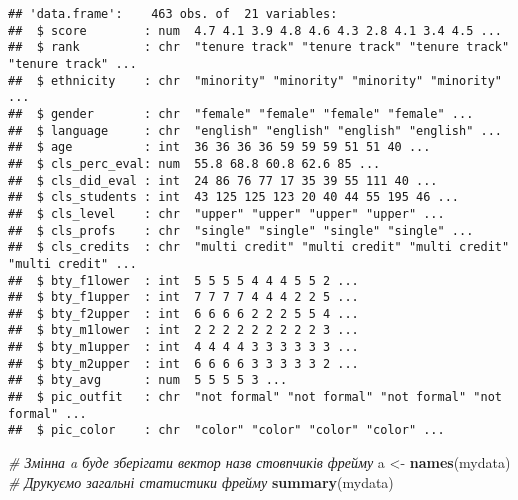 \documentclass[
]{article}
\newenvironment{Shaded}{\begin{snugshade}}{\end{snugshade}}
\newcommand{\CommentTok}[1]{\textcolor[rgb]{0.56,0.35,0.01}{\textit{#1}}}
\newcommand{\KeywordTok}[1]{\textcolor[rgb]{0.13,0.29,0.53}{\textbf{#1}}}
\newcommand{\NormalTok}[1]{#1}
\newcommand{\StringTok}[1]{\textcolor[rgb]{0.31,0.60,0.02}{#1}}
\begin{document}
\begin{verbatim}
## 'data.frame':    463 obs. of  21 variables:
##  $ score        : num  4.7 4.1 3.9 4.8 4.6 4.3 2.8 4.1 3.4 4.5 ...
##  $ rank         : chr  "tenure track" "tenure track" "tenure track" "tenure track" ...
##  $ ethnicity    : chr  "minority" "minority" "minority" "minority" ...
##  $ gender       : chr  "female" "female" "female" "female" ...
##  $ language     : chr  "english" "english" "english" "english" ...
##  $ age          : int  36 36 36 36 59 59 59 51 51 40 ...
##  $ cls_perc_eval: num  55.8 68.8 60.8 62.6 85 ...
##  $ cls_did_eval : int  24 86 76 77 17 35 39 55 111 40 ...
##  $ cls_students : int  43 125 125 123 20 40 44 55 195 46 ...
##  $ cls_level    : chr  "upper" "upper" "upper" "upper" ...
##  $ cls_profs    : chr  "single" "single" "single" "single" ...
##  $ cls_credits  : chr  "multi credit" "multi credit" "multi credit" "multi credit" ...
##  $ bty_f1lower  : int  5 5 5 5 4 4 4 5 5 2 ...
##  $ bty_f1upper  : int  7 7 7 7 4 4 4 2 2 5 ...
##  $ bty_f2upper  : int  6 6 6 6 2 2 2 5 5 4 ...
##  $ bty_m1lower  : int  2 2 2 2 2 2 2 2 2 3 ...
##  $ bty_m1upper  : int  4 4 4 4 3 3 3 3 3 3 ...
##  $ bty_m2upper  : int  6 6 6 6 3 3 3 3 3 2 ...
##  $ bty_avg      : num  5 5 5 5 3 ...
##  $ pic_outfit   : chr  "not formal" "not formal" "not formal" "not formal" ...
##  $ pic_color    : chr  "color" "color" "color" "color" ...
\end{verbatim}

\begin{Shaded}
\begin{Highlighting}[]
\CommentTok{# Змінна a буде зберігати вектор назв стовпчиків фрейму}
\NormalTok{a <-}\StringTok{ }\KeywordTok{names}\NormalTok{(mydata)}
\CommentTok{# Друкуємо загальні статистики фрейму}
\KeywordTok{summary}\NormalTok{(mydata)}
\end{Highlighting}
\end{Shaded}
\end{document}
